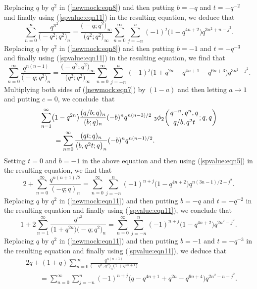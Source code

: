 \documentclass[10pt,a4paper]{amsart}
\numberwithin{equation}{section}
\begin{document}
Replacing $q$ by $q^2$ in (\ref{newmock:eqn8}) and then putting $b=-q$ and $t=-q^{-2}$ and finally using (\ref{spvalue:eqn11}) in the resulting equation, we deduce that
\begin{equation*}%
\sum_{n=0}^{\infty}\frac{q^{n^2}}{\bigl(-q^2; q^2\bigr)_n}=\frac{\bigl(-q; q^2\bigr)_\infty}{\bigl(q^2; q^2\bigr)_\infty}
\sum_{n=0}^\infty \sum_{j=-n}^{n} (-1)^j \bigl(1-q^{4n+2}\bigr) q^{3n^2+n-j^2}.
\end{equation*}
Replacing $q$ by $q^2$ in (\ref{newmock:eqn8}) and then putting $b=-1$ and $t=-q^{-3}$ and finally using (\ref{spvalue:eqn11}) in the resulting equation, we find that
\begin{equation*}%
\sum_{n=0}^{\infty}\frac{q^{n(n-1)}}{\bigl(-q; q^2\bigr)_n}=\frac{\bigl(-q^2; q^2\bigr)_\infty}{\bigl(q^2; q^2\bigr)_\infty}
\sum_{n=0}^\infty \sum_{j=-n}^{n} (-1)^j \bigl(1+q^{2n}-q^{4n+1}-q^{6n+3}\bigr) q^{3n^2-j^2}.
\end{equation*}
Multiplying both sides of (\ref{newmock:eqn7}) by $(1-a)$ and then letting $a \to 1$ and putting $c=0$, we conclude~that
\begin{align}
		&\sum_{n=1}^\infty \bigl(1-q^{2n}\bigr) \frac{(q/b; q)_n}{(b; q)_n} (-b)^n q^{n(n-3)/2}~{_3\phi_2}\biggl({{q^{-n}, q^n, q}\atop{q/b, q^2 t}}; q, q\biggr)\nonumber\\
		&\qquad{}=
		\sum_{n=0}^{\infty}\frac{(qt; q)_n}{\bigl(b, q^2t; q\bigr)_n}(-b)^n q^{n(n-1)/2}.\label{newmock:eqn11}
	\end{align}	
Setting $t=0$ and $b=-1$ in the above equation and then using (\ref{spvalue:eqn5}) in the resulting equation, we find that
\begin{equation*}%
2+\sum_{n=0}^{\infty}\frac{q^{n(n+1)/2}}{(-q; q)_n}
=\sum_{n=0}^{\infty}\sum_{j=-n}^{n}(-1)^{n+j} \bigl(1-q^{4n+2}\bigr) q^{n(3n-1)/2-j^2}.
\end{equation*}
Replacing $q$ by $q^2$ in (\ref{newmock:eqn11}) and then putting $b=-q$ and $t=-q^{-2}$ in the resulting equation and finally using
(\ref{spvalue:eqn11}), we conclude that
\begin{equation*}%
1+2\sum_{n=1}^{\infty} \frac{q^{n^2}}{\bigl(1+q^{2n}\bigr)\bigl(-q; q^2\bigr)_n}
=\sum_{n=0}^{\infty}\sum_{j=-n}^{n}(-1)^{n+j} \bigl(1-q^{4n+2}\bigr) q^{2n^2-j^2}.
\end{equation*}
Replacing $q$ by $q^2$ in (\ref{newmock:eqn11}) and then putting $b=-1$ and $t=-q^{-3}$ in the resulting equation and finally using
(\ref{spvalue:eqn11}), we deduce that
\begin{align*}%
&2q+(1+q)\sum_{n=0}^{\infty} \frac{q^{n(n+1)}}{\bigl(-q^2; q^2\bigr)_n \bigl(1+q^{2n+1}\bigr)}\\
&\qquad{}=\sum_{n=0}^{\infty}\sum_{j=-n}^{n} (-1)^{n+j} \bigl(q-q^{4n+1}+q^{2n}-q^{6n+4}\bigr) q^{2n^2-n-j^2}. \nonumber
\end{align*}
\end{document}
